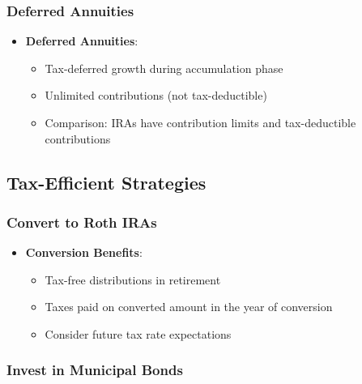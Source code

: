 \documentclass[
]{book}
\providecommand{\tightlist}{%
  \setlength{\itemsep}{0pt}\setlength{\parskip}{0pt}}
\begin{document}
\hypertarget{deferred-annuities}{%
\subsubsection{Deferred Annuities}\label{deferred-annuities}}

\begin{itemize}
\tightlist
\item
  \textbf{Deferred Annuities}:

  \begin{itemize}
  \tightlist
  \item
    Tax-deferred growth during accumulation phase
  \item
    Unlimited contributions (not tax-deductible)
  \item
    Comparison: IRAs have contribution limits and tax-deductible
    contributions
  \end{itemize}
\end{itemize}

\hypertarget{tax-efficient-strategies}{%
\subsection{Tax-Efficient Strategies}\label{tax-efficient-strategies}}

\hypertarget{convert-to-roth-iras}{%
\subsubsection{Convert to Roth IRAs}\label{convert-to-roth-iras}}

\begin{itemize}
\tightlist
\item
  \textbf{Conversion Benefits}:

  \begin{itemize}
  \tightlist
  \item
    Tax-free distributions in retirement
  \item
    Taxes paid on converted amount in the year of conversion
  \item
    Consider future tax rate expectations
  \end{itemize}
\end{itemize}

\hypertarget{invest-in-municipal-bonds}{%
\subsubsection{Invest in Municipal
Bonds}\label{invest-in-municipal-bonds}}
\end{document}
